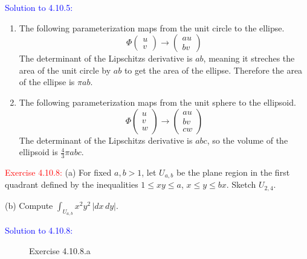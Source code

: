 \documentclass[12pt]{article}
\begin{document}
\textcolor{blue}{Solution to 4.10.5:}
\begin{enumerate}
    \item The following parameterization maps from the unit circle to the ellipse.
        \[
            \Phi\begin{pmatrix} u \\ v \end{pmatrix} \to 
            \begin{pmatrix}
                au \\
                bv
            \end{pmatrix}
        \]
        The determinant of the Lipschitzs derivative is $ab$, meaning it streches
        the area of the unit circle by $ab$ to get the area of the ellipse.
        Therefore the area of the ellipse is $\pi ab$.
    \item The following parameterization maps from the unit sphere to the ellipsoid.
        \[
            \Phi\begin{pmatrix} u \\ v \\ w\end{pmatrix} \to 
            \begin{pmatrix}
                au \\
                bv \\
                cw 
            \end{pmatrix}
        \]
        The determinant of the Lipschitzs derivative is $abc$, 
        so the volume of the ellipsoid is $\frac{4}{3}\pi abc$.
\end{enumerate}



\newpage

\textcolor{red}{Exercise 4.10.8:} (a) For fixed $a,b>1$, let $U_{a,b}$ be the plane region in the first quadrant defined by the inequalities $1\leq xy \leq a$,
$x\leq y \leq bx$. Sketch $U_{2,4}$.

(b) Compute $\displaystyle \int_{U_{a,b}} x^2 y^2 \, |dx\, dy|$.
\medskip

\textcolor{blue}{Solution to 4.10.8:}
\begin{figure}[ht!]
    \centering
{}
    \caption{Exercise 4.10.8.a}
\end{figure}
\end{document}
